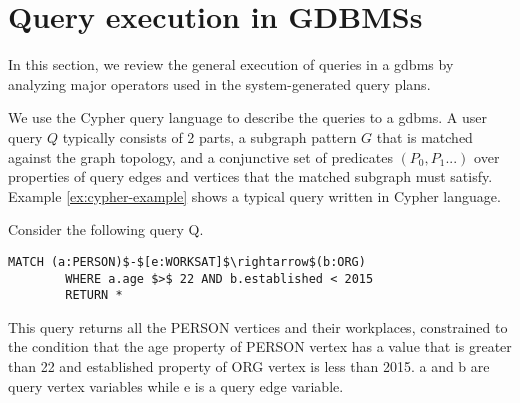 \section{Query execution in GDBMSs}
\label{sec:operators}

In this section, we review the general execution of queries in a \gls{gdbms} by analyzing major operators used in the system-generated query plans.

We use the Cypher query language \cite{cypher} to describe the queries to a \gls{gdbms}.  A user query $Q$ typically consists of 2 parts, 
a subgraph pattern $G$ that is matched against the graph topology, and a conjunctive set of predicates $(P_0, P_1 ...)$ over properties of query edges and vertices that the matched subgraph must satisfy. Example \ref{ex:cypher-example} shows a typical query written in Cypher language.

\vspace{-4pt}
\begin{example}
	\label{ex:cypher-example}
	Consider the following query Q. 
	{\em 
		\begin{lstlisting}[numbers=none,  showstringspaces=false,belowskip=0pt ]
		MATCH (a:PERSON)$-$[e:WORKSAT]$\rightarrow$(b:ORG)
		WHERE a.age $>$ 22 AND b.established < 2015
		RETURN *\end{lstlisting}
	}
	This query returns all the PERSON vertices and their workplaces, constrained to the condition that the \textsc{}age\textsc{} property of PERSON vertex has a value that is greater than 22 and \textsc{}established\textsc{} property of ORG vertex is less than 2015. a and b are query vertex variables while e is a query edge variable.
\end{example}
\vspace{-5pt}

